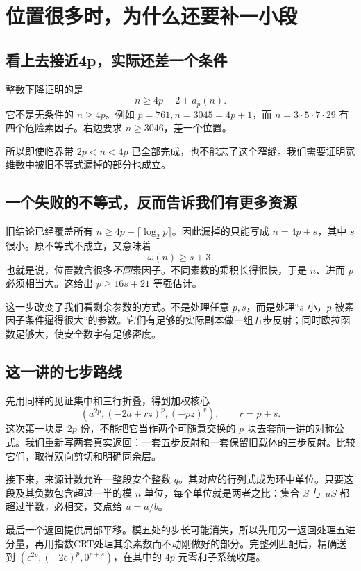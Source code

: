 \chapter{位置很多时，为什么还要补一小段}\label{sec:wide}
\section{看上去接近4p，实际还差一个条件}
整数下降证明的是
\[n\ge4p-2+d_p(n).
\]
它不是无条件的 $n\ge4p$。例如 $p=761,n=3045=4p+1$，而 $n=3\cdot5\cdot7\cdot29$ 有四个危险素因子。右边要求 $n\ge3046$，差一个位置。

所以即使临界带 $2p<n<4p$ 已全部完成，也不能忘了这个窄缝。我们需要证明宽维数中被旧不等式漏掉的部分也成立。

\section{一个失败的不等式，反而告诉我们有更多资源}
旧结论已经覆盖所有 $n\ge4p+\lceil\log_2p\rceil$。因此漏掉的只能写成 $n=4p+s$，其中 $s$ 很小。原不等式不成立，又意味着
\[\omega(n)\ge s+3.
\]
也就是说，位置数含很多\emph{不同}素因子。不同素数的乘积长得很快，于是 $n$、进而 $p$ 必须相当大。这给出 $p\ge16s+21$ 等强估计。

这一步改变了我们看剩余参数的方式。不是处理任意 $p,s$，而是处理“$s$ 小，$p$ 被素因子条件逼得很大”的参数。它们有足够的实际副本做一组五步反射；同时欧拉函数足够大，使安全数字有足够密度。

\section{这一讲的七步路线}
先用同样的见证集中和三行折叠，得到加权核心
\[(a^{2p},(-2a+rz)^p,(-pz)^r),\qquad r=p+s.
\]
这次第一块是 $2p$ 份，不能把它当作两个可随意交换的 $p$ 块去套前一讲的对称公式。我们重新写两套真实返回：一套五步反射和一套保留旧载体的三步反射。比较它们，取得双向剪切和明确同余层。

接下来，来源计数允许一整段安全整数 $q$。其对应的行列式成为环中单位。只要这段及其负数包含超过一半的模 $n$ 单位，每个单位就是两者之比：集合 $S$ 与 $uS$ 都超过半数，必相交，交点给 $u=a/b$。

最后一个返回提供局部平移。模五处的步长可能消失，所以先用另一返回处理五进分量，再用指数CRT处理其余素数而不动刚做好的部分。完整列匹配后，精确送到 $(\epsilon^{2p},(-2\epsilon)^p,0^{p+s})$，在其中的 $4p$ 元零和子系统收尾。

